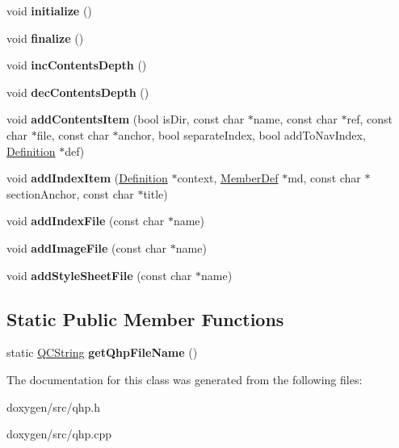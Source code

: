 \begin{DoxyCompactItemize}
\item 
\mbox{\label{class_qhp_a7ee6480507e32d9142ec04d4e499ae7e}} 
void {\bfseries initialize} ()
\item 
\mbox{\label{class_qhp_a89942e1d21257702167ab30834b991cd}} 
void {\bfseries finalize} ()
\item 
\mbox{\label{class_qhp_a50a0c14cf46a57a63afb304df260da59}} 
void {\bfseries inc\+Contents\+Depth} ()
\item 
\mbox{\label{class_qhp_a7c18564920e18fc9bbdcd8ca6c9b21f0}} 
void {\bfseries dec\+Contents\+Depth} ()
\item 
\mbox{\label{class_qhp_ac8c3cd9a9ea8f8d8204124107e9f4b6d}} 
void {\bfseries add\+Contents\+Item} (bool is\+Dir, const char $\ast$name, const char $\ast$ref, const char $\ast$file, const char $\ast$anchor, bool separate\+Index, bool add\+To\+Nav\+Index, \mbox{\hyperlink{class_definition}{Definition}} $\ast$def)
\item 
\mbox{\label{class_qhp_a9217a4348b84dc5d40c588f7b9cf15d3}} 
void {\bfseries add\+Index\+Item} (\mbox{\hyperlink{class_definition}{Definition}} $\ast$context, \mbox{\hyperlink{class_member_def}{Member\+Def}} $\ast$md, const char $\ast$section\+Anchor, const char $\ast$title)
\item 
\mbox{\label{class_qhp_add8bcd3ac9a548c723a801af39d766f6}} 
void {\bfseries add\+Index\+File} (const char $\ast$name)
\item 
\mbox{\label{class_qhp_a2bbb4b9970a2329b32fe335db286ff87}} 
void {\bfseries add\+Image\+File} (const char $\ast$name)
\item 
\mbox{\label{class_qhp_a67f6d219b09bca247db64fe30454eb52}} 
void {\bfseries add\+Style\+Sheet\+File} (const char $\ast$name)
\end{DoxyCompactItemize}
\subsection*{Static Public Member Functions}
\begin{DoxyCompactItemize}
\item 
\mbox{\label{class_qhp_af83942532051a2b155f6ae29b2f727dc}} 
static \mbox{\hyperlink{class_q_c_string}{Q\+C\+String}} {\bfseries get\+Qhp\+File\+Name} ()
\end{DoxyCompactItemize}


The documentation for this class was generated from the following files\+:\begin{DoxyCompactItemize}
\item 
doxygen/src/qhp.\+h\item 
doxygen/src/qhp.\+cpp\end{DoxyCompactItemize}
